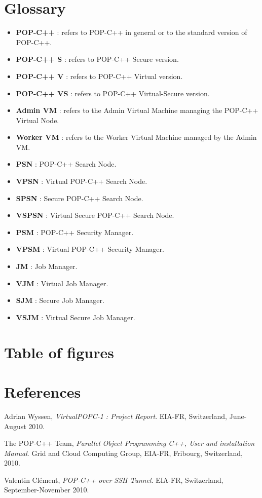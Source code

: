 \documentclass[a4paper, 11pt]{article}
\begin{document}









\pagebreak
\section{Glossary}

\begin{itemize}
\item \textbf{POP-C++} : refers to POP-C++ in general or to the standard version of POP-C++.
\item \textbf{POP-C++ S} : refers to POP-C++ Secure version.
\item \textbf{POP-C++ V} : refers to POP-C++ Virtual version.
\item \textbf{POP-C++ VS} : refers to POP-C++ Virtual-Secure version.
\item \textbf{Admin VM} : refers to the Admin Virtual Machine managing the POP-C++ Virtual Node.
\item \textbf{Worker VM} : refers to the Worker Virtual Machine managed by the Admin VM.
\item \textbf{PSN} : POP-C++ Search Node.
\item \textbf{VPSN} : Virtual POP-C++ Search Node.
\item \textbf{SPSN} : Secure POP-C++ Search Node.
\item \textbf{VSPSN} : Virtual Secure POP-C++ Search Node.
\item \textbf{PSM} : POP-C++ Security Manager.
\item \textbf{VPSM} : Virtual POP-C++ Security Manager.
\item \textbf{JM} : Job Manager.
\item \textbf{VJM} : Virtual Job Manager.
\item \textbf{SJM} : Secure Job Manager.
\item \textbf{VSJM} : Virtual Secure Job Manager.
\end{itemize}

\pagebreak
\section{Table of figures}
\listoffigures{}

%
% 
%

\section{References}
\begin{thebibliography}{9}
	Adrian Wyssen,
  	\emph{VirtualPOPC-1 : Project Report}.
	EIA-FR, Switzerland, 
	June-August 2010.
	
	The POP-C++ Team,
  	\emph{Parallel Object Programming C++, User and installation Manual}.
	Grid and Cloud Computing Group, EIA-FR, Fribourg, Switzerland, 
	2010.
	
	Valentin Clément,
	\emph{POP-C++ over SSH Tunnel}.
	EIA-FR, Switzerland,
	September-November 2010.

\end{thebibliography}



\pagebreak
\appendix

\end{document}
